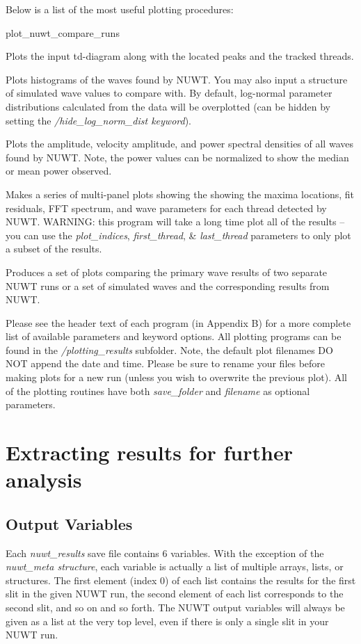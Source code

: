 \documentclass{article}
\begin{document}
Below is a list of the most useful plotting procedures: \\
\begin{labeling}{plot\_nuwt\_compare\_runs}
\item [plot\_nuwt\_peaks] Plots the input td-diagram along with the located peaks and the tracked threads.
\item [plot\_nuwt\_wave\_hist] Plots histograms of the waves found by NUWT. You may also input a structure of simulated wave values to compare with. By default, log-normal parameter distributions calculated from the data will be overplotted (can be hidden by setting the \textit{/hide\_log\_norm\_dist keyword}).
\item [plot\_nuwt\_power\_spec] Plots the amplitude, velocity amplitude, and power spectral densities of all waves found by NUWT. Note, the power values can be normalized to show the median or mean power observed.
\item [plot\_nuwt\_fft\_results] Makes a series of multi-panel plots showing the showing the maxima locations, fit residuals, FFT spectrum, and wave parameters for each thread detected by NUWT. WARNING: this program will take a long time plot all of the results – you can use the \textit{plot\_indices}, \textit{first\_thread}, \& \textit{last\_thread} parameters to only plot a subset of the results.
\item [plot\_nuwt\_compare\_runs] Produces a set of plots comparing the primary wave results of two separate NUWT runs or a set of simulated waves and the corresponding results from NUWT.
\end{labeling}

Please see the header text of each program (in Appendix B) for a more complete list of available parameters and keyword options. All plotting programs can be found in the \textit{/plotting\_results} subfolder. Note, the default plot filenames DO NOT append the date and time. Please be sure to rename your files before making plots for a new run (unless you wish to overwrite the previous plot). All of the plotting routines have both \textit{save\_folder} and \textit{filename} as optional parameters.


\section{Extracting results for further analysis}
\subsection{Output Variables}
Each \textit{nuwt\_results} save file contains 6 variables. With the exception of the \textit{nuwt\_meta structure}, each variable is actually a list of multiple arrays, lists, or structures. The first element (index 0) of each list contains the results for the first slit in the given NUWT run, the second element of each list corresponds to the second slit, and so on and so forth. The NUWT output variables will always be given as a list at the very top level, even if there is only a single slit in your NUWT run. \\
\end{document}
